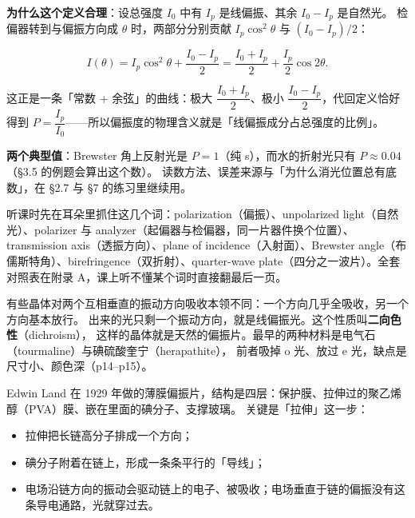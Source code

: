 \documentclass[11pt]{ctexart}
\let\subhdrtheme\subhdr
\renewcommand{\subhdr}[1]{\needspace{4\baselineskip}\subhdrtheme{#1}}
\let\hdrorig\hdr
\renewcommand{\hdr}[2]{\needspace{8\baselineskip}\hdrorig{#1}{#2}}
\begin{document}
\textbf{为什么这个定义合理}：设总强度 $I_0$ 中有 $I_p$ 是线偏振、其余 $I_0-I_p$ 是自然光。
检偏器转到与偏振方向成 $\theta$ 时，两部分分别贡献 $I_p\cos^2\theta$ 与 $(I_0-I_p)/2$：

\[
I(\theta)=I_p\cos^2\theta+\frac{I_0-I_p}{2}
=\frac{I_0+I_p}{2}+\frac{I_p}{2}\cos2\theta .
\]

这正是一条「常数 + 余弦」的曲线：极大 $\dfrac{I_0+I_p}{2}$、极小 $\dfrac{I_0-I_p}{2}$，代回定义恰好得到
$P=\dfrac{I_p}{I_0}$——所以偏振度的物理含义就是「线偏振成分占总强度的比例」。

\textbf{两个典型值}：Brewster 角上反射光是 $P=1$（纯 s），而水的折射光只有 $P\approx0.04$（§3.5 的例题会算出这个数）。
读数方法、误差来源与「为什么消光位置总有底数」，在 §2.7 与 §7 的练习里继续用。


听课时先在耳朵里抓住这几个词：polarization（偏振）、unpolarized light（自然光）、polarizer 与 analyzer（起偏器与检偏器，同一片器件换个位置）、transmission axis（透振方向）、plane of incidence（入射面）、Brewster angle（布儒斯特角）、birefringence（双折射）、quarter-wave plate（四分之一波片）。全套对照表在附录 A，课上听不懂某个词时直接翻最后一页。



有些晶体对两个互相垂直的振动方向吸收本领不同：一个方向几乎全吸收，另一个方向基本放行。
出来的光只剩一个振动方向，就是线偏振光。这个性质叫\textbf{二向色性}（dichroism），
这样的晶体就是天然的偏振片。最早的两种材料是电气石（tourmaline）与碘硫酸奎宁（herapathite），
前者吸掉 o 光、放过 e 光，缺点是尺寸小、颜色深（p14--p15）。


Edwin Land 在 1929 年做的薄膜偏振片，结构是四层：保护膜、拉伸过的聚乙烯醇（PVA）膜、嵌在里面的碘分子、支撑玻璃。
关键是「拉伸」这一步：

\begin{itemize}
\item 拉伸把长链高分子排成一个方向；
\item 碘分子附着在链上，形成一条条平行的「导线」；
\item 电场沿链方向的振动会驱动链上的电子、被吸收；电场垂直于链的偏振没有这条导电通路，光就穿过去。
\end{itemize}
\end{document}
